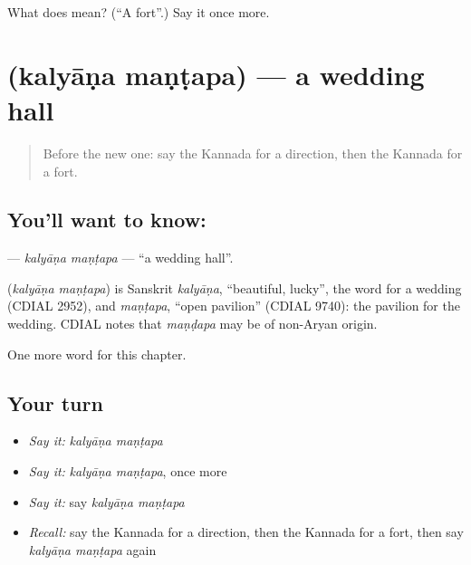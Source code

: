 \begin{tcolorbox}[breakable,colback=teal!4,colframe=teal!35!black,title={Before you move on}]
What does  mean? (\textquotedblleft{}A fort\textquotedblright{}.) Say it once more.
\end{tcolorbox}
\section[\texorpdfstring{\kn{ಕಲ್ಯಾಣ} \kn{ಮಂಟಪ} (kalyāṇa maṇṭapa)}{ಕಲ್ಯಾಣ ಮಂಟಪ (kalyāṇa maṇṭapa)}]{  (kalyāṇa maṇṭapa) — a wedding hall}

\label{lesson:KA-C213-kalyana-mantapa}



\begin{quote}
Before the new one: say the Kannada for a direction, then the Kannada for a fort.
\end{quote}

\subsection*{You'll want to know:  }
\textbf{ } — \emph{kalyāṇa maṇṭapa} — \textquotedblleft{}a wedding hall\textquotedblright{}.

\begin{cousinweb}
\textbf{ } (\emph{kalyāṇa maṇṭapa}) is Sanskrit \emph{kalyāṇa}, \textquotedblleft{}beautiful, lucky\textquotedblright{}, the word for a wedding (CDIAL 2952), and \emph{maṇṭapa}, \textquotedblleft{}open pavilion\textquotedblright{} (CDIAL 9740): the pavilion for the wedding. CDIAL notes that \emph{maṇḍapa} may be of non-Aryan origin.
\end{cousinweb}

\begin{grammarlens}[title={What you've built}]
One more word for this chapter.
\end{grammarlens}

\subsection*{Your turn}
\begin{itemize}
\raggedright
  \item \emph{Say it:} \emph{kalyāṇa maṇṭapa}
  \item \emph{Say it:} \emph{kalyāṇa maṇṭapa}, once more
  \item \emph{Say it:} say \emph{kalyāṇa maṇṭapa}
  \item \emph{Recall:} say the Kannada for a direction, then the Kannada for a fort, then say \emph{kalyāṇa maṇṭapa} again
\end{itemize}

